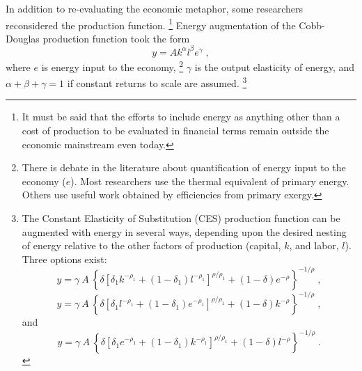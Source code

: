 In addition to re-evaluating the economic metaphor,
some researchers reconsidered the production function.%
	\footnote{
	It must be said that the efforts to include energy 
	as anything other than a cost of production to be evaluated in financial terms
	remain outside the economic mainstream even today.
	}
Energy augmentation of the Cobb-Douglas production function
took the form 
%
\begin{equation} \label{eq:cobb-douglas_with_energy}
	y = A k^{\alpha} l^\beta e^{\gamma}\; ,
\end{equation}	 
%
where $e$ is energy input to the economy,%
	\footnote{
	There is debate in the literature about quantification of 
	energy input to the economy ($e$).
	Most researchers use the thermal equivalent 
	of primary energy.\cite{Cleveland:1984aa, Froling:2009vo, Stern:2012ey, Nel:2010fv}
	Others use useful work obtained by efficiencies from primary exergy.\cite{Ayres:2010ug}
	}
$\gamma$ is the output elasticity of energy, and 
$\alpha + \beta + \gamma = 1$ if constant returns to scale are assumed.%
	\footnote{
	The Constant Elasticity of Substitution (CES) production function
	can be augmented with energy in several ways, 
	depending upon the desired nesting of energy relative to the other
	factors of production (capital, $k$, and labor, $l$).
	Three options exist:
	\begin{equation*}
		y = \gamma \: A \: \left\{\delta \left[\delta_1 k^{-\rho_1} 
		    + (1-\delta_1)l^{-\rho_1} \right]^{\rho/\rho_1} 
		    + (1-\delta) e^{-\rho} \right\}^{-1/\rho} \; ,
	\end{equation*}
	\begin{equation*}
		y = \gamma \: A \: \left\{\delta \left[\delta_1 l^{-\rho_1} 
		    + (1-\delta_1) e^{-\rho_1} \right]^{\rho/\rho_1} 
		    + (1-\delta) k^{-\rho} \right\}^{-1/\rho} \; ,
	\end{equation*}
	and
	\begin{equation*}
	    y = \gamma \: A \: \left\{\delta \left[\delta_1 e^{-\rho_1} 
		    + (1-\delta_1) k^{-\rho_1} \right]^{\rho/\rho_1} 
		    + (1-\delta) l^{-\rho} \right\}^{-1/\rho} \; .
	\end{equation*}
	}

